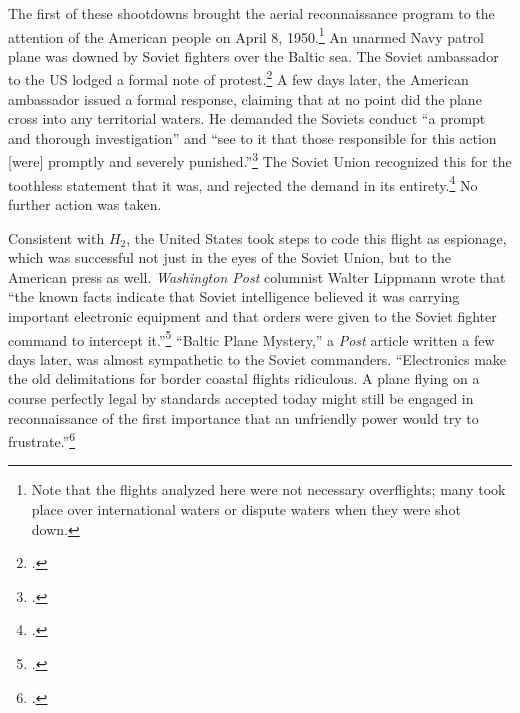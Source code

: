 \documentclass[14pt]{extarticle}
\begin{document}

The first of these shootdowns brought the aerial reconnaissance program to the attention of the American people on April 8, 1950.\footnote{Note that the flights analyzed here were not necessary overflights; many took place over international waters or dispute waters when they were shot down.} An unarmed Navy patrol plane was downed by Soviet fighters over the Baltic sea. The Soviet ambassador to the US lodged a formal note of protest.\footcite{kirk_ambassador_1950} A few days later, the American ambassador issued a formal response, claiming that at no point did the plane cross into any territorial waters. He demanded the Soviets conduct \enquote{a prompt and thorough investigation} and \enquote{see to it that those responsible for this action [were] promptly and severely punished.}\footcite{the_associated_press_text_1950} The Soviet Union recognized this for the toothless statement that it was, and rejected the demand in its entirety.\footcite{salisbury_kremlin_1950} No further action was taken.

Consistent with $H_2$, the United States took steps to code this flight as espionage, which was successful not just in the eyes of the Soviet Union, but to the American press as well. \emph{Washington Post} columnist Walter Lippmann wrote that \enquote{the known facts indicate that Soviet intelligence \textelp{} believed it was carrying important electronic equipment and that orders were given to the Soviet fighter command to intercept it.}\footcite{lippmann_baltic_1950} \enquote{Baltic Plane Mystery,} a \emph{Post} article written a few days later, was almost sympathetic to the Soviet commanders. \enquote{Electronics make the old delimitations for border coastal flights ridiculous. A plane flying on a course perfectly legal by standards accepted today might still be engaged in reconnaissance of the first importance that an unfriendly power would try to frustrate.}\footcite{childs_baltic_1950}

\end{document}

